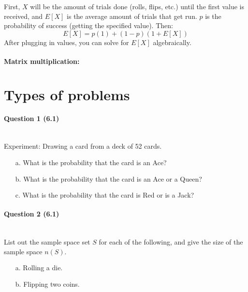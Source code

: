 \documentclass[a4paper,12pt]{book}
\begin{document}
            First, $X$ will be the amount of trials done (rolls, flips, etc.)
            until the first value is received, and $E[X]$ is the
            average amount of trials that get run.
            $p$ is the probability of success (getting the specified value).
            Then:
            $$ E[X] = p(1) + (1-p)(1 + E[X]) $$
            After plugging in values, you can solve for $E[X]$ algebraically.

        \paragraph{Matrix multiplication:}
            
        
        \newpage
        \section*{Types of problems}

        \paragraph{Question 1 (6.1)} ~\\
            Experiment: Drawing a card from a deck of 52 cards.
            \begin{enumerate}
                \item[a.] What is the probability that the card is an Ace?
                \item[b.] What is the probability that the card is an Ace or a Queen?
                \item[c.] What is the probability that the card is Red or is a Jack?
            \end{enumerate}

        \paragraph{Question 2 (6.1)} ~\\
            List out the sample space set $S$ for each of the following,
            and give the size of the sample space $n(S)$.
            \begin{enumerate}
                \item[a.] Rolling a die.
                \item[b.] Flipping two coins.
            \end{enumerate}
\end{document}
